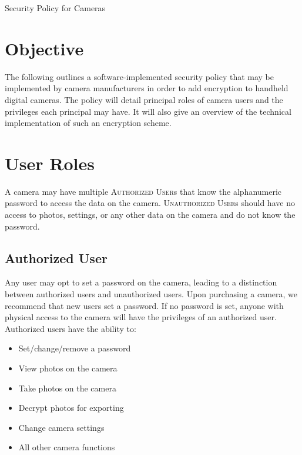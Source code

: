 \documentclass{article}
\begin{document}

  \begin{homeworkProblem}[1]
    Security Policy for Cameras \\

    \solution

      \section{Objective}
        The following outlines a software-implemented security policy that may be implemented by camera manufacturers in order to add encryption to handheld digital cameras. The policy will detail principal roles of camera users and the privileges each principal may have. It will also give an overview of the technical implementation of such an encryption scheme.

      \section{User Roles}
        A camera may have multiple \textsc{Authorized User}s that know the alphanumeric password to access the data on the camera. \textsc{Unauthorized User}s should have no access to photos, settings, or any other data on the camera and do not know the password. \\

      \subsection{Authorized User}
        Any user may opt to set a password on the camera, leading to a distinction between authorized users and unauthorized users. Upon purchasing a camera, we recommend that new users set a password. If no password is set, anyone with physical access to the camera will have the privileges of an authorized user. \\

        Authorized users have the ability to:
        \begin{itemize}
          \item Set/change/remove a password
          \item View photos on the camera
          \item Take photos on the camera
          \item Decrypt photos for exporting
          \item Change camera settings
          \item All other camera functions
        \end{itemize}


\end{homeworkProblem}
\end{document}

